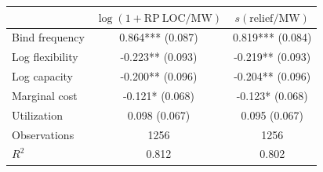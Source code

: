 \begin{tabular}{lcc}
\toprule
& $\log(1+\mathrm{RP\ LOC/MW})$ & $s(\mathrm{relief/MW})$ \\
\midrule
Bind frequency & 0.864*** (0.087) & 0.819*** (0.084) \\
Log flexibility & -0.223** (0.093) & -0.219** (0.093) \\
Log capacity & -0.200** (0.096) & -0.204** (0.096) \\
Marginal cost & -0.121* (0.068) & -0.123* (0.068) \\
Utilization & 0.098 (0.067) & 0.095 (0.067) \\
\midrule
Observations & 1256 & 1256 \\
$R^2$ & 0.812 & 0.802 \\
\bottomrule
\end{tabular}
